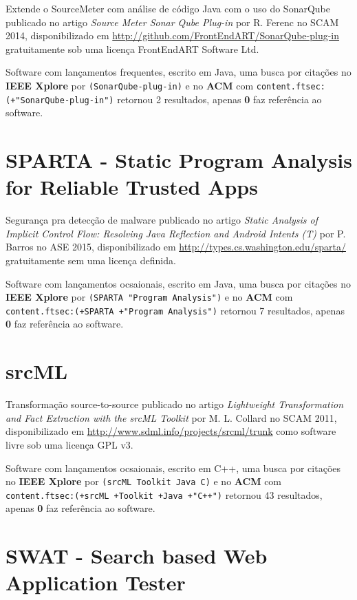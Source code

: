 Extende o SourceMeter com análise de código Java com o uso do SonarQube
publicado no artigo {\it Source Meter Sonar Qube Plug-in}
por R. Ferenc
no SCAM 2014,
disponibilizado em \url{http://github.com/FrontEndART/SonarQube-plug-in}
gratuitamente
sob uma licença FrontEndART Software Ltd.

Software com lançamentos frequentes,
escrito em Java,
uma busca por citações no {\bf IEEE Xplore} por
\texttt{(SonarQube-plug-in)}
e no {\bf ACM} com
\texttt{content.ftsec:(+"SonarQube-plug-in")}
retornou
2 resultados, apenas
{\bf 0} faz referência ao software.



\section{SPARTA - Static Program Analysis for Reliable Trusted Apps}

Segurança pra detecção de malware
publicado no artigo {\it Static Analysis of Implicit Control Flow: Resolving Java Reflection and Android Intents (T)}
por P. Barros
no ASE 2015,
disponibilizado em \url{http://types.cs.washington.edu/sparta/}
gratuitamente
sem uma licença definida.

Software com lançamentos ocsaionais,
escrito em Java,
uma busca por citações no {\bf IEEE Xplore} por
\texttt{(SPARTA "Program Analysis")}
e no {\bf ACM} com
\texttt{content.ftsec:(+SPARTA +"Program Analysis")}
retornou
7 resultados, apenas
{\bf 0} faz referência ao software.



\section{srcML}

Transformação source-to-source
publicado no artigo {\it Lightweight Transformation and Fact Extraction with the srcML Toolkit}
por M. L. Collard
no SCAM 2011,
disponibilizado em \url{http://www.sdml.info/projects/srcml/trunk}
como software livre
sob uma licença GPL v3.

Software com lançamentos ocsaionais,
escrito em C++,
uma busca por citações no {\bf IEEE Xplore} por
\texttt{(srcML Toolkit Java C)}
e no {\bf ACM} com
\texttt{content.ftsec:(+srcML +Toolkit +Java +"C++")}
retornou
43 resultados, apenas
{\bf 0} faz referência ao software.



\section{SWAT - Search based Web Application Tester}

